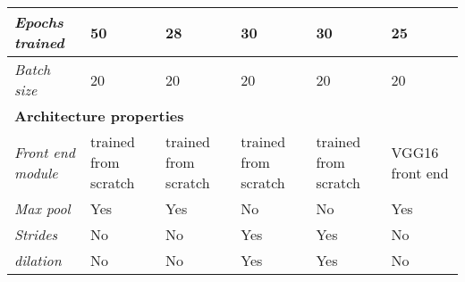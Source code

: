 \begin{table}[]
\begin{tabular}{|l|l|l|l|l|l|}
		\textit{Epochs trained}            &     50       &     28  &     30   &     30                                                                                     &      25                                                                          \\ \hline
		\textit{Batch size}                &         20                                                          &     20                                                              &       20                                                            &        20                                                                                  &   20                                                                            \\ \hline \hline
		\multicolumn{6}{|l|}{\textbf{Architecture properties}} \\ \hline 
		\textit{Front end module}          & trained from scratch                                              & trained from scratch                                              & trained from scratch                                              & trained from scratch                                                                     & VGG16 front end                                                                \\ \hline
		\textit{Max pool}                  & Yes                                                               & Yes                                                               & No                                                                & No                                                                                       & Yes                                                                            \\ \hline
		\textit{Strides}                   & No                                                                & No                                                                & Yes                                                               & Yes                                                                                      & No                                                                             \\ \hline
		\textit{dilation}                  & No                                                                & No                                                                & Yes                                                               & Yes                                                                                      & No                                                                             \\ \hline

\end{tabular}
\end{table}
